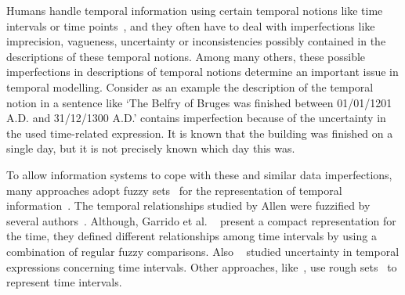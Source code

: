 Humans handle temporal information using certain temporal notions like time intervals or time points~\cite{Dyreson1994}, and they often have to deal with imperfections like imprecision, vagueness, uncertainty or inconsistencies possibly contained in the descriptions of these temporal notions. Among many others, these possible imperfections in descriptions of temporal notions determine an important issue in temporal modelling. Consider as an example the description of the temporal notion in a sentence like `The Belfry of Bruges was finished between 01/01/1201 A.D. and 31/12/1300 A.D.' contains imperfection because of the uncertainty in the used time-related expression. It is known that the building was finished on a single day, but it is not precisely known  which day this was.

To allow information systems to cope with these and similar data imperfections, many approaches adopt fuzzy sets~\cite{Zadeh1965} for the representation of temporal information~\cite{Mitra1994,Nagypal2003,Billiet2011,Dubois2003}. The temporal relationships studied by Allen were fuzzified by several authors~\cite{Ohlbach2004,Nagypal2003,Schockaert2008}. Although,  Garrido et al. ~\cite{Garrido2009} present a compact representation for the time, they defined different relationships among time intervals by using a combination of regular fuzzy comparisons. Also ~\cite{Garrido2009,Pons2011} studied uncertainty in temporal expressions concerning time intervals. Other approaches, like~\cite{Qiang2009}, use rough sets~\cite{Pawlak1995} to represent time intervals.


